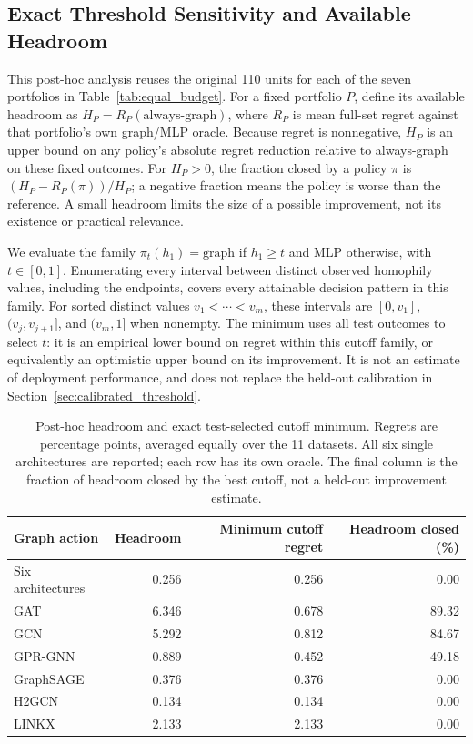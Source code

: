 \subsection{Exact Threshold Sensitivity and Available Headroom}
\label{app:threshold_headroom}

This post-hoc analysis reuses the original 110 units for each of the seven portfolios in Table~\ref{tab:equal_budget}. For a fixed portfolio $P$, define its available headroom as $H_P=R_P(\mathrm{always\mbox{-}graph})$, where $R_P$ is mean full-set regret against that portfolio's own graph/MLP oracle. Because regret is nonnegative, $H_P$ is an upper bound on any policy's absolute regret reduction relative to always-graph on these fixed outcomes. For $H_P>0$, the fraction closed by a policy $\pi$ is $(H_P-R_P(\pi))/H_P$; a negative fraction means the policy is worse than the reference. A small headroom limits the size of a possible improvement, not its existence or practical relevance.

We evaluate the family $\pi_t(h_1)=\mathrm{graph}$ if $h_1\geq t$ and MLP otherwise, with $t\in[0,1]$. Enumerating every interval between distinct observed homophily values, including the endpoints, covers every attainable decision pattern in this family. For sorted distinct values $v_1<\cdots<v_m$, these intervals are $[0,v_1]$, $(v_j,v_{j+1}]$, and $(v_m,1]$ when nonempty. The minimum uses all test outcomes to select $t$: it is an empirical lower bound on regret within this cutoff family, or equivalently an optimistic upper bound on its improvement. It is not an estimate of deployment performance, and does not replace the held-out calibration in Section~\ref{sec:calibrated_threshold}.

\begin{table}[ht]
\centering
\caption{Post-hoc headroom and exact test-selected cutoff minimum. Regrets are percentage points, averaged equally over the 11 datasets. All six single architectures are reported; each row has its own oracle. The final column is the fraction of headroom closed by the best cutoff, not a held-out improvement estimate.}
\label{tab:threshold_headroom}
\small
\begin{tabular}{@{}lrrr@{}}
\toprule
Graph action & Headroom & Minimum cutoff regret & Headroom closed (\%) \\
\midrule
Six architectures & 0.256 & 0.256 & 0.00 \\
GAT & 6.346 & 0.678 & 89.32 \\
GCN & 5.292 & 0.812 & 84.67 \\
GPR-GNN & 0.889 & 0.452 & 49.18 \\
GraphSAGE & 0.376 & 0.376 & 0.00 \\
H2GCN & 0.134 & 0.134 & 0.00 \\
LINKX & 2.133 & 2.133 & 0.00 \\
\bottomrule
\end{tabular}
\end{table}

